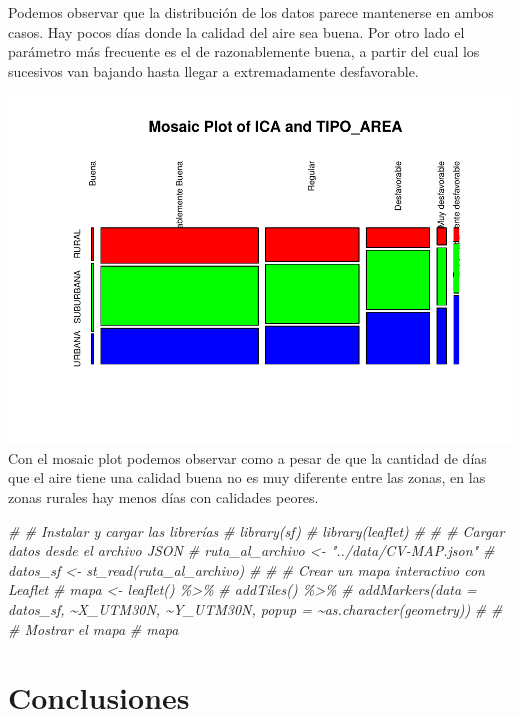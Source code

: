 \documentclass[notspecified,article,submit,moreauthors,pdftex]{Definitions/mdpi}
\newenvironment{Shaded}{\begin{snugshade}}{\end{snugshade}}
\newcommand{\CommentTok}[1]{\textcolor[rgb]{0.56,0.35,0.01}{\textit{#1}}}
\begin{document}
Podemos observar que la distribución de los datos parece mantenerse en
ambos casos. Hay pocos días donde la calidad del aire sea buena. Por
otro lado el parámetro más frecuente es el de razonablemente buena, a
partir del cual los sucesivos van bajando hasta llegar a extremadamente
desfavorable.

\includegraphics{ProyectoAED2023_files/figure-latex/unnamed-chunk-46-1.pdf}
Con el mosaic plot podemos observar como a pesar de que la cantidad de
días que el aire tiene una calidad buena no es muy diferente entre las
zonas, en las zonas rurales hay menos días con calidades peores.

\begin{Shaded}
\begin{Highlighting}[]
\CommentTok{\# \# Instalar y cargar las librerías}
\CommentTok{\# library(sf)}
\CommentTok{\# library(leaflet)}
\CommentTok{\# }
\CommentTok{\# \# Cargar datos desde el archivo JSON}
\CommentTok{\# ruta\_al\_archivo \textless{}{-} "../data/CV{-}MAP.json"}
\CommentTok{\# datos\_sf \textless{}{-} st\_read(ruta\_al\_archivo)}
\CommentTok{\# }
\CommentTok{\# \# Crear un mapa interactivo con Leaflet}
\CommentTok{\# mapa \textless{}{-} leaflet() \%\textgreater{}\%}
\CommentTok{\#   addTiles() \%\textgreater{}\%}
\CommentTok{\#   addMarkers(data = datos\_sf, \textasciitilde{}X\_UTM30N, \textasciitilde{}Y\_UTM30N, popup = \textasciitilde{}as.character(geometry))}
\CommentTok{\# }
\CommentTok{\# \# Mostrar el mapa}
\CommentTok{\# mapa}
\end{Highlighting}
\end{Shaded}

\hypertarget{conclusiones}{%
\section{Conclusiones}\label{conclusiones}}
\end{document}

